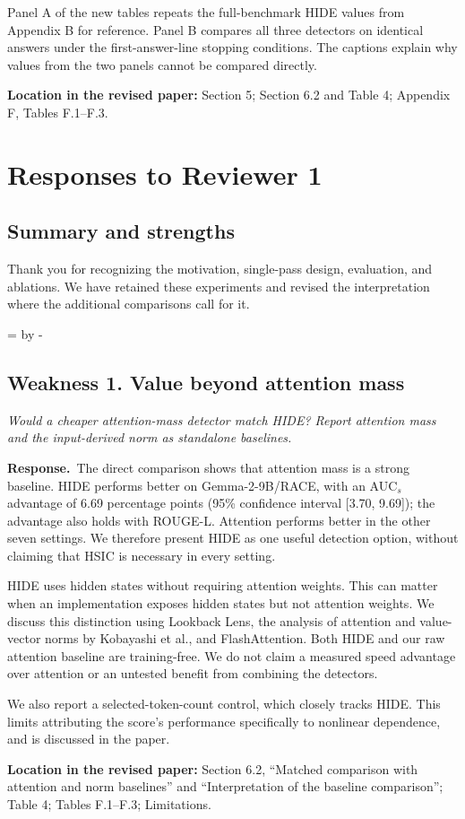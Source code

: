 \documentclass[11pt]{article}
\newcommand{\Needspace}[1]{\par\begingroup
  \dimen0=\pagegoal\advance\dimen0 by -\pagetotal
  \ifdim\dimen0<#1\relax\newpage\fi\endgroup}
\newcommand{\reviewcomment}[2]{%
  \Needspace{9\baselineskip}%
  \subsection*{#1}%
  \begin{tcolorbox}[enhanced,breakable,colback=gray!8,colframe=gray!50,
    boxrule=0pt,borderline west={2pt}{0pt}{gray!55},sharp corners]
  \itshape #2
  \end{tcolorbox}}
\newcommand{\response}{\textbf{Response.}\ }
\newcommand{\location}[1]{\par\textbf{Location in the revised paper:} #1\par}
\begin{document}
Panel A of the new tables repeats the full-benchmark HIDE values from Appendix B for reference. Panel B compares all three detectors on identical answers under the first-answer-line stopping conditions. The captions explain why values from the two panels cannot be compared directly.
\location{Section 5; Section 6.2 and Table 4; Appendix F, Tables F.1--F.3.}

\section*{Responses to Reviewer 1}

\subsection*{Summary and strengths}
Thank you for recognizing the motivation, single-pass design, evaluation, and ablations. We have retained these experiments and revised the interpretation where the additional comparisons call for it.

\reviewcomment{Weakness 1. Value beyond attention mass}{Would a cheaper attention-mass detector match HIDE? Report attention mass and the input-derived norm as standalone baselines.}
\response The direct comparison shows that attention mass is a strong baseline. HIDE performs better on Gemma-2-9B/RACE, with an AUC$_s$ advantage of 6.69 percentage points (95\% confidence interval [3.70, 9.69]); the advantage also holds with ROUGE-L. Attention performs better in the other seven settings. We therefore present HIDE as one useful detection option, without claiming that HSIC is necessary in every setting.

HIDE uses hidden states without requiring attention weights. This can matter when an implementation exposes hidden states but not attention weights. We discuss this distinction using Lookback Lens, the analysis of attention and value-vector norms by Kobayashi et al., and FlashAttention. Both HIDE and our raw attention baseline are training-free. We do not claim a measured speed advantage over attention or an untested benefit from combining the detectors.

We also report a selected-token-count control, which closely tracks HIDE. This limits attributing the score's performance specifically to nonlinear dependence, and is discussed in the paper.
\location{Section 6.2, ``Matched comparison with attention and norm baselines'' and ``Interpretation of the baseline comparison''; Table 4; Tables F.1--F.3; Limitations.}
\end{document}
